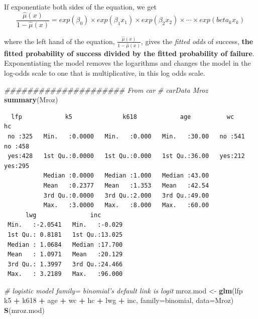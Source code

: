 \documentclass[
]{article}
\newenvironment{Shaded}{\begin{snugshade}}{\end{snugshade}}
\newcommand{\CommentTok}[1]{\textcolor[rgb]{0.56,0.35,0.01}{\textit{#1}}}
\newcommand{\DataTypeTok}[1]{\textcolor[rgb]{0.13,0.29,0.53}{#1}}
\newcommand{\KeywordTok}[1]{\textcolor[rgb]{0.13,0.29,0.53}{\textbf{#1}}}
\newcommand{\NormalTok}[1]{#1}
\newcommand{\OperatorTok}[1]{\textcolor[rgb]{0.81,0.36,0.00}{\textbf{#1}}}
\newcommand{\StringTok}[1]{\textcolor[rgb]{0.31,0.60,0.02}{#1}}
\begin{document}
If exponentiate both sides of the equation, we get
\[\frac{\hat\mu(x)}{1-\hat\mu(x)} = exp(\beta_0) \times exp(\beta_1 x_1) \times exp(\beta_2 x_2) \times \cdots \times exp(beta_k x_k)\]

where the left hand of the equation,
\(\frac{\hat\mu(x)}{1-\hat\mu(x)}\), gives the \emph{fitted odds} of
success, \textbf{the fitted probability of success divided by the fitted
probability of failure}. Exponentiating the model removes the logarithms
and changes the model in the log-odds scale to one that is
multiplicative, in this log odds scale.

\begin{Shaded}
\begin{Highlighting}[]
\CommentTok{##################### From car}
\CommentTok{# carData Mroz}
\KeywordTok{summary}\NormalTok{(Mroz)}
\end{Highlighting}
\end{Shaded}

\begin{verbatim}
  lfp            k5              k618            age          wc        hc     
 no :325   Min.   :0.0000   Min.   :0.000   Min.   :30.00   no :541   no :458  
 yes:428   1st Qu.:0.0000   1st Qu.:0.000   1st Qu.:36.00   yes:212   yes:295  
           Median :0.0000   Median :1.000   Median :43.00                      
           Mean   :0.2377   Mean   :1.353   Mean   :42.54                      
           3rd Qu.:0.0000   3rd Qu.:2.000   3rd Qu.:49.00                      
           Max.   :3.0000   Max.   :8.000   Max.   :60.00                      
      lwg               inc        
 Min.   :-2.0541   Min.   :-0.029  
 1st Qu.: 0.8181   1st Qu.:13.025  
 Median : 1.0684   Median :17.700  
 Mean   : 1.0971   Mean   :20.129  
 3rd Qu.: 1.3997   3rd Qu.:24.466  
 Max.   : 3.2189   Max.   :96.000  
\end{verbatim}

\begin{Shaded}
\begin{Highlighting}[]
\CommentTok{# logistic model family= binomial's default link is logit}
\NormalTok{mroz.mod <-}\StringTok{ }\KeywordTok{glm}\NormalTok{(lfp }\OperatorTok{~}\StringTok{ }\NormalTok{k5 }\OperatorTok{+}\StringTok{ }\NormalTok{k618 }\OperatorTok{+}\StringTok{ }\NormalTok{age }\OperatorTok{+}\StringTok{ }\NormalTok{wc }\OperatorTok{+}\StringTok{ }\NormalTok{hc }\OperatorTok{+}\StringTok{ }\NormalTok{lwg }\OperatorTok{+}\StringTok{ }\NormalTok{inc, }\DataTypeTok{family=}\NormalTok{binomial, }\DataTypeTok{data=}\NormalTok{Mroz)}
\KeywordTok{S}\NormalTok{(mroz.mod)}
\end{Highlighting}
\end{Shaded}
\end{document}
